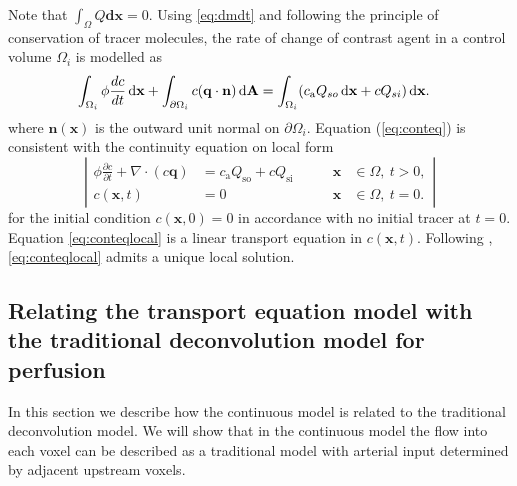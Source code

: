 \documentclass[final,5p,times,twocolumn]{elsarticle}
\begin{document}
	Note that $\int_\Omega Q  \mathbf{dx} = 0$. 
	Using \eqref{eq:dmdt} and following the principle of conservation of tracer molecules, the rate of change of contrast agent in a control volume $\Omega_i$ is modelled as
	\begin{align}
		& \int_{\Omega_i} \phi \frac{d c}{dt} \,\mathrm{d} \mathbf{x} + \int_{\partial \Omega_i}c(\mathbf{q} \cdot \mathbf{n}) \,\mathrm{d} \mathbf{A}
		 = \int_{\Omega_i}(c_\mathrm{a} Q_{so} \,\mathrm{d} \mathbf{x} + c Q_{si}) \,\mathrm{d} \mathbf{x}.
		\label{eq:conteq}
	\end{align}
	where $\mathbf{n}(\mathbf{x})$ is the outward unit normal on $\partial \Omega_i$.
	Equation (\ref{eq:conteq}) is consistent with the continuity equation on local form
	\begin{equation}
		\left\vert
		\begin{alignedat}{2}
			\phi \frac{\partial c}{\partial t} + \nabla \cdot (c\mathbf{q}) &= c_\mathrm{a}Q_{\mathrm{so}} + cQ_{\mathrm{si}} \qquad	&\mathbf{x} &\in \Omega, \ t>0,  \\
			c(\mathbf{x},t) &= 0 																			 	&\mathbf{x} &\in \Omega, \ t=0.
		\end{alignedat}
		\right\vert
		\label{eq:conteqlocal}
	\end{equation}
	for the initial condition $c(\mathbf{x},0) = 0$ in accordance with no initial tracer at $t = 0$.
	Equation \eqref{eq:conteqlocal} is a linear transport equation in $c(\mathbf{x},t)$. 
	Following \cite{evans98}, \eqref{eq:conteqlocal} admits a unique local solution.


\subsection{Relating the transport equation model with the traditional deconvolution model for perfusion}\label{sec:NewAndOld}
	In this section we describe how the continuous model is related to the traditional deconvolution model.
	We will show that in the continuous model the flow into each voxel can be described as a traditional model with arterial input determined by adjacent upstream voxels.
\end{document}
